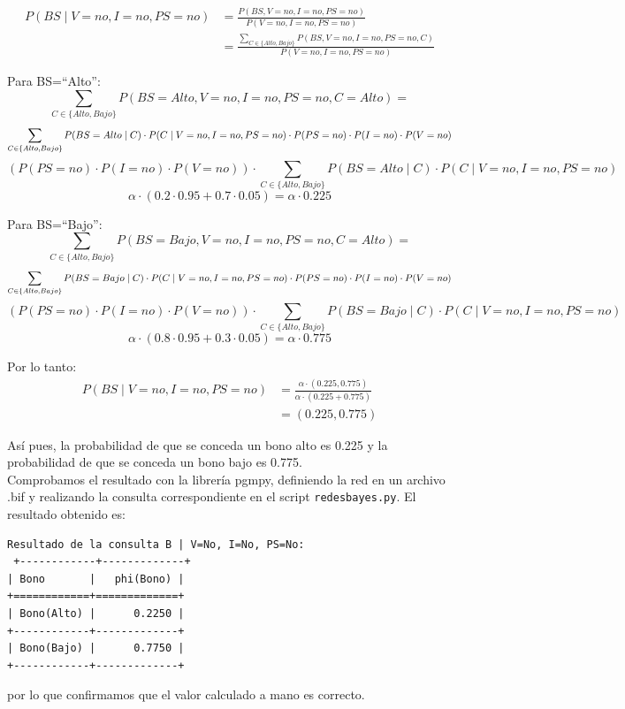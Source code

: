 \documentclass[11pt,a4paper]{article}
\begin{document}
\begin{align*}
    P(BS \mid V=no, I=no, PS=no) &= \frac{P(BS, V=no, I=no, PS=no)}{P(V=no, I=no, PS=no)} \\
    & = \frac{\sum_{C \in \{Alto, Bajo\}} P(BS, V=no, I=no, PS=no, C)}{P(V=no, I=no, PS=no)}
\end{align*}

Para BS=``Alto'':
$$
    \sum_{C \in \{Alto, Bajo\}} P(BS=Alto, V=no, I=no, PS=no, C=Alto) = 
$$
$$
    \sum_{C \in \{Alto, Bajo\}} P(BS=Alto \mid C ) \cdot P(C \mid V=no, I=no, PS=no) \cdot P(PS=no) \cdot P(I=no) \cdot P(V=no) \\
$$
$$    
    (P(PS=no) \cdot P(I=no) \cdot P(V=no)) \cdot \sum_{C \in \{Alto, Bajo\}} P(BS=Alto \mid C ) \cdot P(C \mid V=no, I=no, PS=no)
$$
$$
    \alpha \cdot (0.2 \cdot 0.95 + 0.7 \cdot 0.05) = \alpha \cdot 0.225
$$

Para BS=``Bajo'':
$$
    \sum_{C \in \{Alto, Bajo\}} P(BS=Bajo, V=no, I=no, PS=no, C=Alto) = 
$$
$$
    \sum_{C \in \{Alto, Bajo\}} P(BS=Bajo \mid C ) \cdot P(C \mid V=no, I=no, PS=no) \cdot P(PS=no) \cdot P(I=no) \cdot P(V=no) \\
$$
$$    
    (P(PS=no) \cdot P(I=no) \cdot P(V=no)) \cdot \sum_{C \in \{Alto, Bajo\}} P(BS=Bajo \mid C ) \cdot P(C \mid V=no, I=no, PS=no)
$$
$$
    \alpha \cdot (0.8 \cdot 0.95 + 0.3 \cdot 0.05) = \alpha \cdot 0.775
$$

Por lo tanto:
\begin{align*}
     P(BS \mid V=no, I=no, PS=no) &= \frac{\alpha \cdot (0.225, 0.775)}{\alpha \cdot (0.225 + 0.775)} \\
     &= (0.225, 0.775)
\end{align*}

Así pues, la probabilidad de que se conceda un bono alto es 0.225 y la probabilidad de que se conceda un bono bajo es 0.775. \\

Comprobamos el resultado con la librería pgmpy, definiendo la red en un archivo .bif y realizando la consulta correspondiente en el script \texttt{redesbayes.py}.
El resultado obtenido es:
\begin{verbatim}
Resultado de la consulta B | V=No, I=No, PS=No:
 +------------+-------------+
| Bono       |   phi(Bono) |
+============+=============+
| Bono(Alto) |      0.2250 |
+------------+-------------+
| Bono(Bajo) |      0.7750 |
+------------+-------------+ 
\end{verbatim}
por lo que confirmamos que el valor calculado a mano es correcto. \\
\end{document}
